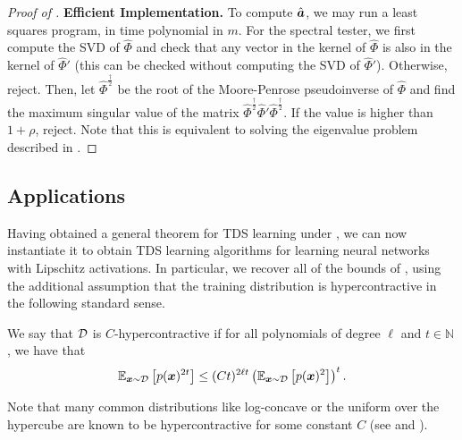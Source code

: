 \documentclass[11pt]{article} %
\numberwithin{equation}{section}
\begin{document}
\begin{proof}[Proof of ]
    \noindent\textbf{Efficient Implementation.} To compute $\hat {{\bm{a}}}$, we may run a least squares program, in time polynomial in $m$. For the spectral tester, we first compute the SVD of $\hat\Phi$ and check that any vector in the kernel of $\hat\Phi$ is also in the kernel of $\hat\Phi'$ (this can be checked without computing the SVD of $\hat\Phi'$). Otherwise, reject. Then, let $\hat\Phi^{\frac{\dagger}{2}}$ be the root of the Moore-Penrose pseudoinverse of $\hat\Phi$ and find the maximum singular value of the matrix $\hat\Phi^{\frac{\dagger}{2}}\hat\Phi'\hat\Phi^{\frac{\dagger}{2}}$. If the value is higher than $1+\rho$, reject. Note that this is equivalent to solving the eigenvalue problem described in .
\end{proof}


\subsection{Applications}

Having obtained a general theorem for TDS learning under , we can now instantiate it to obtain TDS learning algorithms for learning neural networks with Lipschitz activations. In particular, we recover all of the bounds of \cite{reliable_goel2017}, using the additional assumption that the training distribution is hypercontractive in the following standard sense. 

\begin{definition}[Hypercontractivity]\label{definition:hypercontractivity-standard}
    We say that ${\mathcal{D}}$ is $C$-hypercontractive if for all polynomials of degree $\ell$ and $t\in \mathbb{N}$, we have that 
     \[
    \mathbb{E}_{{\bm{x}}\sim {\mathcal{D}}}\left[p({\bm{x}})^{2t}\right]\leq (Ct)^{2\ell t}\left(\mathbb{E}_{{\bm{x}}\sim {\mathcal{D}}}\left[p({\bm{x}})^2\right]\right)^{t}.
    \]
    
\end{definition}

Note that many common distributions like log-concave or the uniform over the hypercube are known to be hypercontractive for some constant $C$ (see \cite{carbery2001distributional} and \cite{o2014analysis}).
\end{document}
